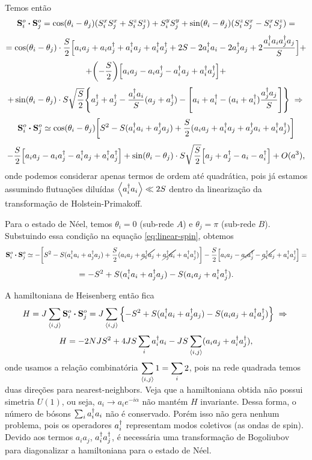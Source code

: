 \documentclass[a4paper,10pt]{article}
\begin{document}
Temos então
$$
\vb{S}_i^o \vdot \vb{S}_j^o =
\cos(\theta_i-\theta_j) (S_i^xS_j^x + S_i^zS_j^z) + S_i^yS_j^y +
\sin(\theta_i-\theta_j) (S_i^zS_j^x - S_i^xS_j^z) =
$$
$$
=
\cos(\theta_i - \theta_j) \cdot \frac{S}{2}
\Big[
a_i a_j + a_i a_j^\dagger + a_i^\dagger a_j + a_i^\dagger a_j^\dagger +
2S  - 2 a_i^\dagger a_i - 2 a_j^\dagger a_j + 2 \frac{a_i^\dagger a_i a_j^\dagger a_j}{S}
\Big] +
$$
$$
+ \qty(-\frac{S}{2})
\Big[
a_ia_j - a_ia_j^\dagger - a_i^\dagger a_j + a_i^\dagger a_j^\dagger
\Big] +
$$
$$
+ \sin(\theta_i - \theta_j) \cdot S \sqrt{\frac{S}{2}}
\qty{
a_j^\dagger+ a_j^\dagger- \frac{a_i^\dagger a_i}{S} (a_j+a_j^\dagger) -
\qty[a_i + a_i^\dagger- (a_i + a_i^\dagger) \frac{a_j^\dagger a_j}{S}]
} \; \Rightarrow \;
$$
\begin{equation} \label{eq:linear-spin}
\vb{S}_i^o \vdot \vb{S}_j^o \simeq
\cos(\theta_i - \theta_j)
\qty[
S^2 - S(a_i^\d a_i + a_j^\d a_j) +
\frac{S}{2} (a_i a_j + a_i^\d a_j + a_j^\d a_i + a_i^\d a_j^\d)
]
\end{equation}
$$
-\frac{S}{2}
\Big[
a_ia_j - a_ia_j^\dagger - a_i^\dagger a_j + a_i^\dagger a_j^\dagger
\Big] +
\sin(\theta_i - \theta_j) \cdot S \sqrt{\frac{S}{2}}
\qty[a_j + a_j^\dagger - a_i - a_i^\dagger]
+ O(a^3),
$$
onde podemos considerar apenas termos de ordem até quadrática, pois já estamos assumindo flutuações diluídas $\ev{a_i^\d a_i} \ll 2S$ dentro da linearização da transformação de Holstein-Primakoff.

Para o estado de Néel, temos $\theta_i = 0$ (sub-rede $A$) e $\theta_j = \pi$ (sub-rede $B$). Substuindo essa condição na equação \ref{eq:linear-spin}, obtemos
$$
\vb{S}_i^o \vdot \vb{S}_j^o \simeq
- \qty[
S^2 - S(a_i^\d a_i + a_j^\d a_j) +
\frac{S}{2} (a_i a_j + \cancel{a_i^\d a_j} + \cancel{a_j^\d a_i} + a_i^\d a_j^\d)
]
-\frac{S}{2}
\Big[
a_ia_j - \cancel{a_ia_j^\d} - \cancel{a_i^\d a_j} + a_i^\d a_j^\d
\Big] =
$$
$$
= -S^2 + S(a_i^\dagger a_i + a_j^\dagger a_j) - S (a_i a_j + a_i^\dagger a_j^\dagger).
$$

A hamiltoniana de Heisenberg então fica
$$
H = J \sum_{\nn{i}{j}} \vb{S}_i^o \vdot \vb{S}_j^o =
J \sum_{\nn{i}{j}} \qty{-S^2 + S(a_i^\d a_i + a_j^\d a_j) - S (a_i a_j + a_i^\d a_j^\d)} \implies
$$
$$
H = - 2N JS^2 + 4JS \sum_{i} a_i^\dagger a_i - JS \sum_{\left\langle i , j \right\rangle} (a_i a_j + a_i^\dagger a_j^\dagger),
$$
onde usamos a relação combinatória $\displaystyle{\sum_{\left\langle i , j \right\rangle} 1 = \sum_{i} 2}$, pois na rede quadrada temos duas direções para nearest-neighbors. Veja que a hamiltoniana obtida não possui simetria $U(1)$, ou seja, $a_i \to a_i e^{-i\alpha}$ não mantém $H$ invariante. Dessa forma, o número de bósons $\sum_{i} a_i^\dagger a_i$ não é conservado. Porém isso não gera nenhum problema, pois os operadores $a_i^\dagger$ representam modos coletivos (as ondas de spin). Devido aos termos $a_i a_j$, $a_i^\dagger a_j^\dagger$, é necessária uma transformação de Bogoliubov para diagonalizar a hamiltoniana para o estado de Néel.
\end{document}
